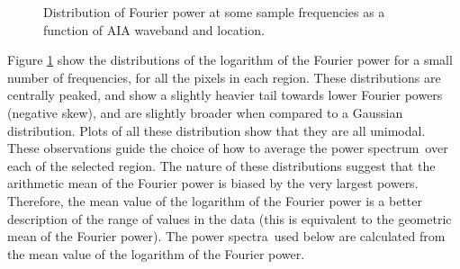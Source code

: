 \documentclass{aastex}
\newcommand{\PS}{power spectrum}
\newcommand{\PA}{power spectra}
\begin{document}
\begin{figure}
\centerline{
}
\centerline{
}
\centerline{
}
\centerline{
}
\caption{Distribution of Fourier power at some sample frequencies as a
function of AIA waveband and location.}
\label{fig:dist171193}
\end{figure}
Figure \ref{fig:dist171193} show the distributions of the logarithm of
the Fourier power for a small number of frequencies, for all the
pixels in each region.  These distributions are centrally peaked, and
show a slightly heavier tail towards lower Fourier powers (negative
skew), and are slightly broader when compared to a Gaussian
distribution.  Plots of all these distribution show that they are all
unimodal.  These observations guide the choice of how to average the
\PS\ over each of the selected region.  The nature of these
distributions suggest that the arithmetic mean of the Fourier power is
biased by the very largest powers.  Therefore, the mean value of the
logarithm of the Fourier power is a better description of the range of
values in the data (this is equivalent to the geometric mean of the
Fourier power).  The \PA\ used below are calculated from the mean
value of the logarithm of the Fourier power.
\end{document}
